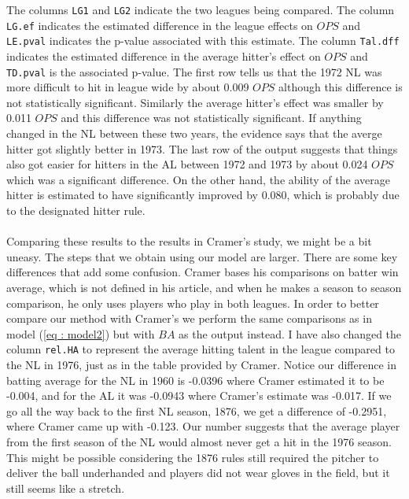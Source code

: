 \documentclass [52pt] {article}
\begin{document}
The columns \verb|LG1| and \verb|LG2| indicate the two leagues being compared.  The column \verb|LG.ef| indicates the estimated difference in the league effects on $OPS$ and \verb|LE.pval| indicates the p-value associated with this estimate.  The column \verb|Tal.dff| indicates the estimated difference in the average hitter's effect on $OPS$ and \verb|TD.pval| is the associated p-value.  The first row tells us that the 1972 NL was more difficult to hit in league wide by about 0.009 $OPS$ although this difference is not statistically significant.  Similarly the average hitter's effect was smaller by 0.011 $OPS$ and this difference was not statistically significant.  If anything changed in the NL between these two years, the evidence says that the averge hitter got slightly better in 1973.  The last row of the output suggests that things also got easier for hitters in the AL between 1972 and 1973 by about 0.024 $OPS$ which was a significant difference.  On the other hand, the ability of the average hitter is estimated to have significantly improved by 0.080, which is probably due to the designated hitter rule.
\\\\
Comparing these results to the results in Cramer's study, we might be a bit uneasy.  The steps that we obtain using our model are larger.  There are some key differences that add some confusion.  Cramer bases his comparisons on batter win average, which is not defined in his article, and when he makes a season to season comparison, he only uses players who play in both leagues.  In order to better compare our method with Cramer's we perform the same comparisons as in model (\ref{eq : model2}) but with $BA$ as the output instead.  I have also changed the column \verb|rel.HA| to represent the average hitting talent in the league compared to the NL in 1976, just as in the table provided by Cramer.  Notice our difference in batting average for the NL in 1960 is -0.0396 where Cramer estimated it to be -0.004, and for the AL it was -0.0943 where Cramer's estimate was -0.017.  If we go all the way back to the first NL season, 1876, we get a difference of -0.2951, where Cramer came up with -0.123.  Our number suggests that the average player from the first season of the NL would almost never get a hit in the 1976 season.  This might be possible considering the 1876 rules still required the pitcher to deliver the ball underhanded and players did not wear gloves in the field, but it still seems like a stretch.
\end{document}
